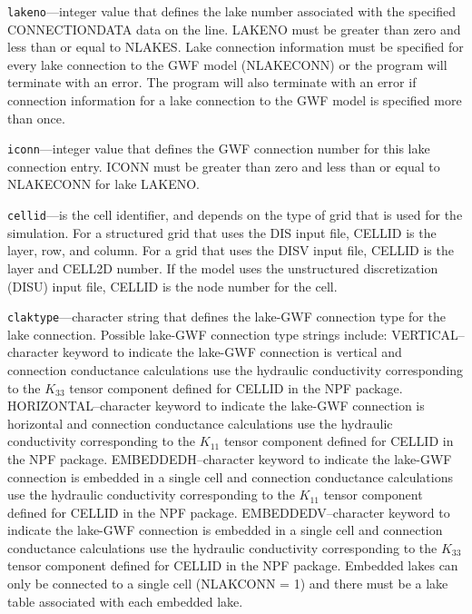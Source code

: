 \begin{description}
\item \texttt{lakeno}---integer value that defines the lake number associated with the specified CONNECTIONDATA data on the line. LAKENO must be greater than zero and less than or equal to NLAKES. Lake connection information must be specified for every lake connection to the GWF model (NLAKECONN) or the program will terminate with an error.  The program will also terminate with an error if connection information for a lake connection to the GWF model is specified more than once.

\item \texttt{iconn}---integer value that defines the GWF connection number for this lake connection entry. ICONN must be greater than zero and less than or equal to NLAKECONN for lake LAKENO.

\item \texttt{cellid}---is the cell identifier, and depends on the type of grid that is used for the simulation.  For a structured grid that uses the DIS input file, CELLID is the layer, row, and column.   For a grid that uses the DISV input file, CELLID is the layer and CELL2D number.  If the model uses the unstructured discretization (DISU) input file, CELLID is the node number for the cell.

\item \texttt{claktype}---character string that defines the lake-GWF connection type for the lake connection. Possible lake-GWF connection type strings include:  VERTICAL--character keyword to indicate the lake-GWF connection is vertical  and connection conductance calculations use the hydraulic conductivity corresponding to the $K_{33}$ tensor component defined for CELLID in the NPF package. HORIZONTAL--character keyword to indicate the lake-GWF connection is horizontal and connection conductance calculations use the hydraulic conductivity corresponding to the $K_{11}$ tensor component defined for CELLID in the NPF package. EMBEDDEDH--character keyword to indicate the lake-GWF connection is embedded in a single cell and connection conductance calculations use the hydraulic conductivity corresponding to the $K_{11}$ tensor component defined for CELLID in the NPF package. EMBEDDEDV--character keyword to indicate the lake-GWF connection is embedded in a single cell and connection conductance calculations use the hydraulic conductivity corresponding to the $K_{33}$ tensor component defined for CELLID in the NPF package. Embedded lakes can only be connected to a single cell (NLAKCONN = 1) and there must be a lake table associated with each embedded lake.


\end{description}
